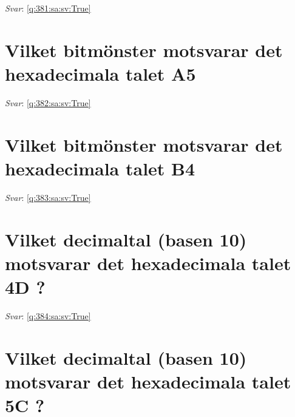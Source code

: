 \documentclass[a4paper,11pt,oneside]{book}
\begin{document}
\begin{sloppypar}
\textit{Svar}: \autoref{q:381:sa:sv:True}



\section{Vilket bitm\"onster motsvarar det hexadecimala talet A5}

\label{q:382:sa:sv:False}

\vspace{2cm}

\noindent\makebox[\textwidth]{\hrulefill}

\vspace{1cm}

\textit{Svar}: \autoref{q:382:sa:sv:True}



\section{Vilket bitm\"onster motsvarar det hexadecimala talet B4}

\label{q:383:sa:sv:False}

\vspace{2cm}

\noindent\makebox[\textwidth]{\hrulefill}

\vspace{1cm}

\textit{Svar}: \autoref{q:383:sa:sv:True}



\section{Vilket decimaltal (basen 10) motsvarar det hexadecimala talet 4D ?}

\label{q:384:sa:sv:False}

\vspace{2cm}

\noindent\makebox[\textwidth]{\hrulefill}

\vspace{1cm}

\textit{Svar}: \autoref{q:384:sa:sv:True}



\section{Vilket decimaltal (basen 10) motsvarar det hexadecimala talet 5C ?}


\end{sloppypar}
\end{document}
